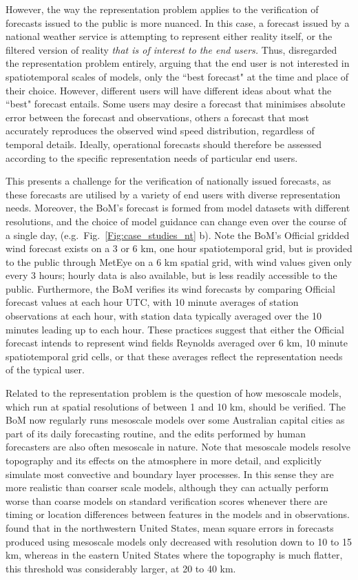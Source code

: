 \documentclass[twocol]{ametsoc}
\begin{document}
However, the way the representation problem applies to the verification of forecasts issued to the public is more nuanced. In this case, a forecast issued by a national weather service is attempting to represent either reality itself, or the filtered version of reality \textit{that is of interest to the end users.} Thus, \citet{pinson12} disregarded the representation problem entirely, arguing that the end user is not interested in spatiotemporal scales of models, only the ``best forecast" at the time and place of their choice. However, different users will have different ideas about what the ``best" forecast entails. Some users may desire a forecast that minimises absolute error between the forecast and observations, others a forecast that most accurately reproduces the observed wind speed distribution, regardless of temporal details. Ideally, operational forecasts should therefore be assessed according to the specific representation needs of particular end users. 

This presents a challenge for the verification of nationally issued forecasts, as these forecasts are utilised by a variety of end users with diverse representation needs. Moreover, the BoM's forecast is formed from model datasets with different resolutions, and the choice of model guidance can change even over the course of a single day, (e.g.~Fig.~\ref{Fig:case_studies_nt} b). Note the BoM's Official gridded wind forecast exists on a 3 or 6 km, one hour spatiotemporal grid, but is provided to the public through MetEye \citep{bomMetEye19} on a 6 km spatial grid, with wind values given only every 3 hours; hourly data is also available, but is less readily accessible to the public. Furthermore, the BoM verifies its wind forecasts by comparing Official forecast values at each hour UTC, with 10 minute averages of station observations at each hour, with station data typically averaged over the 10 minutes leading up to each hour. These practices suggest that either the Official forecast intends to represent wind fields Reynolds averaged over 6 km, 10 minute spatiotemporal grid cells, or that these averages reflect the representation needs of the typical user. 

Related to the representation problem is the question of how mesoscale models, which run at spatial resolutions of between 1 and 10 km, should be verified. The BoM now regularly runs mesoscale models over some Australian capital cities as part of its daily forecasting routine, and the edits performed by human forecasters are also often mesoscale in nature. Note that mesoscale models resolve topography and its effects on the atmosphere in more detail, and explicitly simulate most convective and boundary layer processes. In this sense they are more realistic than coarser scale models, although they can actually perform worse than coarse models on standard verification scores whenever there are timing or location differences between features in the models and in observations. \citet{mass02} found that in the northwestern United States, mean square errors in forecasts produced using mesoscale models only decreased with resolution down to 10 to 15 km, whereas in the eastern United States where the topography is much flatter, this threshold was considerably larger, at 20 to 40 km. 
\end{document}

